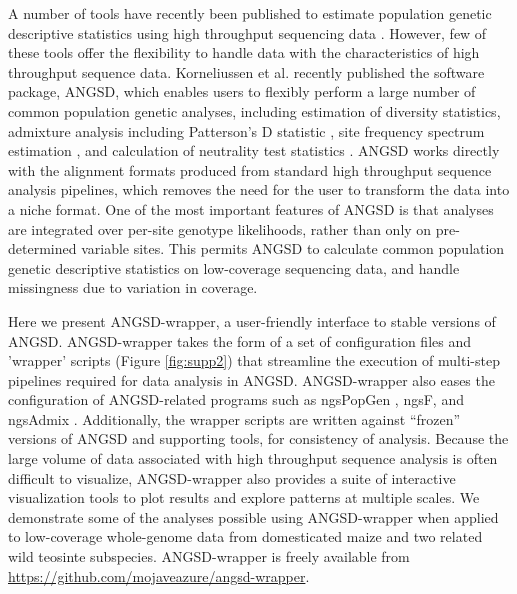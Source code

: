 \documentclass[10pt,a4paper]{article}
\begin{document}
A number of tools have recently been published to estimate population genetic descriptive statistics using high throughput sequencing data \citep{garrigan2013popbam, purcell2007plink, danecek2011variant, hutter2006genome}. 
However, few of these tools offer the flexibility to handle data with the characteristics of high throughput sequence data. 
Korneliussen et al. \citep{korneliussen2014angsd} recently published the software package, ANGSD, which enables users to flexibly perform a large number of common population genetic analyses, including estimation of diversity statistics, admixture analysis including Patterson's D statistic \citep{Durand:2011jd}, site frequency spectrum estimation \citep{pmid22911679}, and calculation of neutrality test statistics \citep{korneliussen_calculation_2013}. 
ANGSD works directly with the alignment formats produced from standard high throughput sequence analysis pipelines, which removes the need for the user to transform the data into a niche format. 
One of the most important features of ANGSD is that analyses are integrated over per-site genotype likelihoods, rather than only on pre-determined variable sites. 
This permits ANGSD to calculate common population genetic descriptive statistics on low-coverage sequencing data, and handle missingness due to variation in coverage. 

Here we present ANGSD-wrapper, a user-friendly interface to stable versions of ANGSD. 
ANGSD-wrapper takes the form of a set of configuration files and 'wrapper' scripts (Figure \ref{fig:supp2}) that streamline the execution of multi-step pipelines required for data analysis in ANGSD. 
ANGSD-wrapper also eases the configuration of ANGSD-related programs such as ngsPopGen \citep{ngsPopGen}, ngsF\citep{vieira2013estimating}, and ngsAdmix \citep{pmid24026093}. 
Additionally, the wrapper scripts are written against ``frozen'' versions of ANGSD and supporting tools, for consistency of analysis. 
Because the large volume of data associated with high throughput sequence analysis is often difficult to visualize, ANGSD-wrapper also provides a suite of interactive visualization tools to plot results and explore patterns at multiple scales.  
We demonstrate some of the analyses possible using ANGSD-wrapper when applied to low-coverage whole-genome data from domesticated maize and two related wild teosinte subspecies. 
ANGSD-wrapper is freely available from \url{https://github.com/mojaveazure/angsd-wrapper}.
\end{document}
